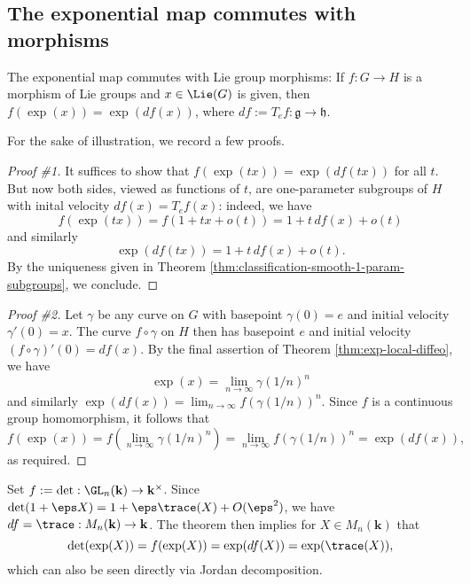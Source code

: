 \documentclass[reqno]{amsart} 
\begin{document}
\subsection{The exponential map commutes with morphisms\label{sec:exp-commutes-with-morphisms}}
\label{sec:org45e312b}
\begin{theorem}
  The exponential map commutes with Lie group morphisms:
  If $f : G \rightarrow H$ is a morphism of Lie groups
  and $x \in \Lie(G)$ is given,
  then
  $f(\exp (x)) = \exp(d f(x))$, where $d f := T_e f : \mathfrak{g} \rightarrow \mathfrak{h}$.
\end{theorem}
For the sake of illustration, we record a few proofs.
\begin{proof}
[Proof \#1]
  It suffices to show that
  $f(\exp(t x)) = \exp(d f(t x))$ for all $t$.
  But now both sides, viewed as functions of $t$,
  are one-parameter subgroups
  of $H$
  with inital velocity
  $d f(x) = T_e f(x)$:
  indeed, we have
  \begin{equation*}
  f(\exp(t x))
  = f(1 + t x + o(t))
  = 1 + t \,d f(x)  + o(t)
  \end{equation*}
  and similarly
  \begin{equation*}
  \exp(d f(t x)) = 1 + t \, d f(x) + o(t).
  \end{equation*}
  By the uniqueness given in Theorem
  \ref{thm:classification-smooth-1-param-subgroups},
  we conclude.
\end{proof}
\begin{proof}
[Proof \#2]
  Let $\gamma$ be any curve on $G$ with
  basepoint $\gamma(0) = e$ and initial velocity $\gamma '(0) =
  x$.
  The curve $f \circ \gamma$ on $H$ then has basepoint $e$
  and initial velocity $(f \circ \gamma )'(0) = d f(x)$.
  By the final assertion of Theorem \ref{thm:exp-local-diffeo},
  we have
  \begin{equation*}
\exp (x) = \lim_{n \rightarrow \infty} \gamma(1/n)^n
\end{equation*}
  and similarly $\exp(d f(x)) = \lim_{n \rightarrow \infty}
  f(\gamma(1/n))^n$.
  Since $f$ is a continuous group homomorphism, it follows that
  \begin{equation*}
  f(\exp(x))
  = f( \lim_{n \rightarrow \infty} \gamma(1/n)^n)
  = \lim_{n \rightarrow \infty} f(\gamma(1/n))^n
  = \exp(d f(x)),
  \end{equation*}
  as required.
\end{proof}

\begin{example}
  Set $f := \det : \GL_n(\mathbf{k}) \rightarrow
  \mathbf{k}^\times$.
  Since $\det(1 + \eps X) = 1 + \eps \trace(X) + O(\eps^2)$,
  we have $d f = \trace : M_n(\mathbf{k}) \rightarrow
  \mathbf{k}$.
  The theorem then implies for $X \in M_n(\mathbf{k})$ that
  \begin{equation*}
    \det(\exp(X)) = f(\exp(X))
    = \exp(d f(X)) = \exp(\trace(X)),
  \end{equation*}
  which can also be seen directly via Jordan decomposition.
\end{example}
\end{document}
